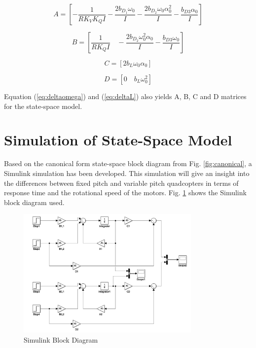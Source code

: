 \begin{equation}
    A = \left[-\frac{1}{RK_VK_QI}-\frac{2b_D_1\omega_0}{I}-\frac{2b_D_2\omega_0\alpha_0^2}{I}-\frac{b_{D3}\alpha_0}{I}\right]
\end{equation}

\begin{equation}
    B = \left[\frac{1}{RK_QI}\quad - \frac{2b_D_2\omega_0^2\alpha_0}{I} - \frac{b_{D3}\omega_0}{I}  \right]
\end{equation}

\begin{equation}
    C = \left[2b_L\omega_0\alpha_0 \right]
\end{equation}

\begin{equation}
    D = \left[0\quad b_L\omega_0^2\right]
\end{equation}

Equation (\ref{eq:deltaomega}) and (\ref{eq:deltaL}) also yields A, B, C and D matrices for the state-space model. 

\newpage
\section{Simulation of State-Space Model}
\label{sec:simulation}
Based on the canonical form state-space block diagram from Fig. \ref{fig:canonical}, a Simulink simulation has been developed. This simulation will give an insight into the differences between fixed pitch and variable pitch quadcopters in terms of response time and the rotational speed of the motors. Fig. \ref{fig:simulink} shows the Simulink block diagram used. \bigskip

\begin{figure}[H]
    \centering
    \includegraphics[width = 0.8\textwidth]{VAPIQ-PICTURES/simulinkblock.png}
    \caption{Simulink Block Diagram}
    \label{fig:simulink}
\end{figure}\bigskip

